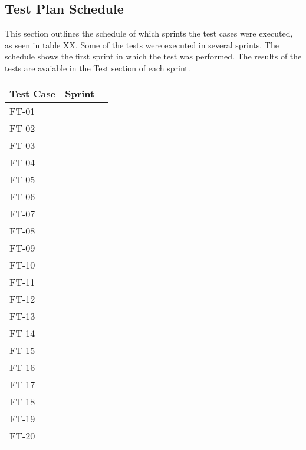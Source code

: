 \subsection{Test Plan Schedule}

This section outlines the schedule of which sprints the test cases were executed, as seen in table XX. Some of the tests were executed in several sprints. The schedule shows the first sprint in which the test was performed. The results of the tests are avaiable in the Test section of each sprint.


\begin{tabular}{| l | l | l |}
	\hline
	\rowcolor{lightgray}
	{\bf Test Case} & {\bf Sprint} \\ \hline
	FT-01 & \\ \hline
	FT-02 & \\ \hline
	FT-03 & \\ \hline
	FT-04 & \\ \hline
	FT-05 & \\ \hline
	FT-06 & \\ \hline
	FT-07 & \\ \hline
	FT-08 & \\ \hline
	FT-09 & \\ \hline
	FT-10 & \\ \hline
	FT-11 & \\ \hline
	FT-12 & \\ \hline
	FT-13 & \\ \hline
	FT-14 & \\ \hline
	FT-15 & \\ \hline
	FT-16 & \\ \hline
	FT-17 & \\ \hline
	FT-18 & \\ \hline
	FT-19 & \\ \hline
	FT-20 & \\
	\hline
\end{tabular}